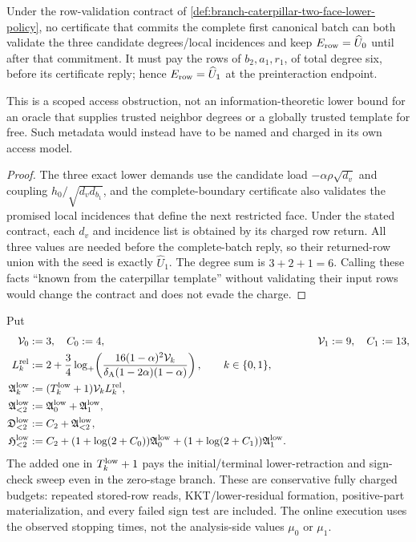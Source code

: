 \begin{proposition}
\label{prop:branch-caterpillar-first-layer-row-preexposure-obstruction}
Under the row-validation contract of
\cref{def:branch-caterpillar-two-face-lower-policy}, no certificate that
commits the complete first canonical batch can both validate the three
candidate degrees/local incidences and keep
$E_{\rm row}=\widehat U_0$ until after that commitment.  It must pay the rows
of $b_2,a_1,r_1$, of total degree six, before its certificate reply; hence
$E_{\rm row}=\widehat U_1$ at the preinteraction endpoint.

This is a scoped access obstruction, not an information-theoretic lower bound
for an oracle that supplies trusted neighbor degrees or a globally trusted
template for free.  Such metadata would instead have to be named and charged
in its own access model.
\end{proposition}

\begin{proof}
The three exact lower demands use the candidate load
$-\alpha\rho\sqrt{d_v}$ and coupling
$h_0/\sqrt{d_vd_{b_1}}$, and the complete-boundary certificate also validates
the promised local incidences that define the next restricted face.  Under
the stated contract, each $d_v$ and incidence list is obtained by its charged
row return.  All three values are needed before the complete-batch reply, so
their returned-row union with the seed is exactly $\widehat U_1$.  The degree
sum is $3+2+1=6$.  Calling these facts ``known from the caterpillar
template'' without validating their input rows would change the contract and
does not evade the charge.
\end{proof}

Put
\begin{align}
 \mathcal V_0&:=3,\quad C_0:=4,
 &\qquad \mathcal V_1:=9,\quad C_1:=13,
 \notag\\
 L_k^{\rm rel}
 &:=2+\frac34\log_+\!\left(
  \frac{16(1-\alpha)^2\mathcal V_k}
       {\delta_{\rm A}(1-2\alpha)(1-\alpha)}
                           \right),\qquad k\in\{0,1\},
 \notag\\
 \mathfrak A_k^{\rm low}
 &:=(T_k^{\rm low}+1)\mathcal V_kL_k^{\rm rel},
 \notag\\
 \mathfrak A_{<2}^{\rm low}
 &:=\mathfrak A_0^{\rm low}+\mathfrak A_1^{\rm low},
 \notag\\
 \mathfrak D_{<2}^{\rm low}
 &:=C_2+\mathfrak A_{<2}^{\rm low},
 \notag\\
 \mathfrak H_{<2}^{\rm low}
 &:=C_2+
  (1+\log(2+C_0))\mathfrak A_0^{\rm low}
  +(1+\log(2+C_1))\mathfrak A_1^{\rm low}.
 \label{eq:branch-caterpillar-two-face-lower-budgets}
\end{align}
The added one in $T_k^{\rm low}+1$ pays the initial/terminal lower-retraction
and sign-check sweep even in the zero-stage branch.  These are conservative
fully charged budgets: repeated stored-row reads, KKT/lower-residual
formation, positive-part materialization, and every failed sign test are
included.  The online execution uses the observed stopping times, not the
analysis-side values $\mu_0$ or $\mu_1$.

